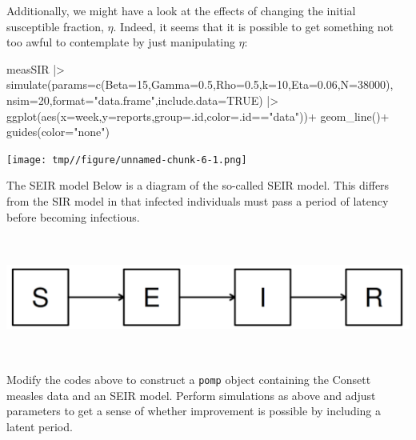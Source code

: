 \documentclass[
  ignorenonframetext,
  aspectratio=169,
  t]{beamer}
\newenvironment{Shaded}{\begin{snugshade}}{\end{snugshade}}
\newcommand{\AttributeTok}[1]{\textcolor[rgb]{0.40,0.45,0.13}{#1}}
\newcommand{\ConstantTok}[1]{\textcolor[rgb]{0.56,0.35,0.01}{#1}}
\newcommand{\DecValTok}[1]{\textcolor[rgb]{0.68,0.00,0.00}{#1}}
\newcommand{\FloatTok}[1]{\textcolor[rgb]{0.68,0.00,0.00}{#1}}
\newcommand{\FunctionTok}[1]{\textcolor[rgb]{0.28,0.35,0.67}{#1}}
\newcommand{\NormalTok}[1]{\textcolor[rgb]{0.00,0.23,0.31}{#1}}
\newcommand{\SpecialCharTok}[1]{\textcolor[rgb]{0.37,0.37,0.37}{#1}}
\newcommand{\StringTok}[1]{\textcolor[rgb]{0.13,0.47,0.30}{#1}}
\theoremstyle{definition}
\begin{document}
\begin{frame}[fragile]
Additionally, we might have a look at the effects of changing the
initial susceptible fraction, \(\eta\). Indeed, it seems that it is
possible to get something not too awful to contemplate by just
manipulating \(\eta\):

\begin{Shaded}
\begin{Highlighting}[]
\NormalTok{measSIR }\SpecialCharTok{|\textgreater{}}
  \FunctionTok{simulate}\NormalTok{(}\AttributeTok{params=}\FunctionTok{c}\NormalTok{(}\AttributeTok{Beta=}\DecValTok{15}\NormalTok{,}\AttributeTok{Gamma=}\FloatTok{0.5}\NormalTok{,}\AttributeTok{Rho=}\FloatTok{0.5}\NormalTok{,}\AttributeTok{k=}\DecValTok{10}\NormalTok{,}\AttributeTok{Eta=}\FloatTok{0.06}\NormalTok{,}\AttributeTok{N=}\DecValTok{38000}\NormalTok{),}
    \AttributeTok{nsim=}\DecValTok{20}\NormalTok{,}\AttributeTok{format=}\StringTok{"data.frame"}\NormalTok{,}\AttributeTok{include.data=}\ConstantTok{TRUE}\NormalTok{) }\SpecialCharTok{|\textgreater{}}
  \FunctionTok{ggplot}\NormalTok{(}\FunctionTok{aes}\NormalTok{(}\AttributeTok{x=}\NormalTok{week,}\AttributeTok{y=}\NormalTok{reports,}\AttributeTok{group=}\NormalTok{.id,}\AttributeTok{color=}\NormalTok{.id}\SpecialCharTok{==}\StringTok{"data"}\NormalTok{))}\SpecialCharTok{+}
  \FunctionTok{geom\_line}\NormalTok{()}\SpecialCharTok{+}
  \FunctionTok{guides}\NormalTok{(}\AttributeTok{color=}\StringTok{"none"}\NormalTok{)}
\end{Highlighting}
\end{Shaded}

\begin{center}
\texttt{[image: tmp//figure/unnamed-chunk-6-1.png]}
\end{center}
\end{frame}

\begin{frame}[fragile]{The SEIR model}
\label{the-seir-model}
Below is a diagram of the so-called SEIR model. This differs from the
SIR model in that infected individuals must pass a period of latency
before becoming infectious.

\begin{center}
    \includegraphics[height=4cm]{../graphics/SEIR model.png}
  \end{center}

Modify the codes above to construct a \texttt{pomp} object containing
the Consett measles data and an SEIR model. Perform simulations as above
and adjust parameters to get a sense of whether improvement is possible
by including a latent period.
\end{frame}
\end{document}
